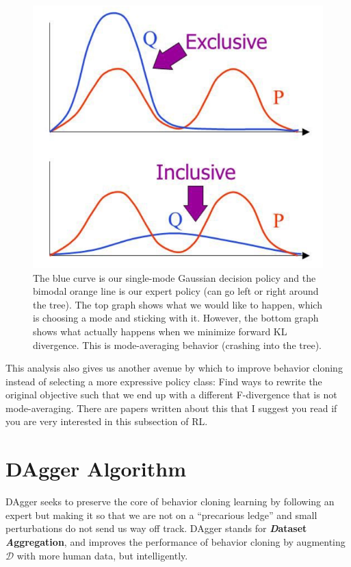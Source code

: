     \begin{figure}[H]
        \centering
        \includegraphics[width=0.7\linewidth]{rl/diffkl.png}
        \caption{The blue curve is our single-mode Gaussian decision policy and the bimodal orange line is our expert policy (can go left or right around the tree). The top graph shows what we would like to happen, which is choosing a mode and sticking with it. However, the bottom graph shows what actually happens when we minimize forward KL divergence. This is mode-averaging behavior (crashing into the tree).}
        \label{fig:diffkl}
    \end{figure}

    This analysis also gives us another avenue by which to improve behavior cloning instead of selecting a more expressive policy class: Find ways to rewrite the original objective such that we end up with a different F-divergence that is not mode-averaging. There are papers written about this that I suggest you read if you are very interested in this subsection of RL.

\section{DAgger Algorithm}
    \large DAgger seeks to preserve the core of behavior cloning \textemdash\; learning by following an expert \textemdash\; but making it so that we are not on a ``precarious ledge'' and small perturbations do not send us way off track. DAgger stands for \textbf{\textit{D}ataset \textit{A}ggregation}, and improves the performance of behavior cloning by augmenting $\mathcal{D}$ with more human data, but intelligently. 


